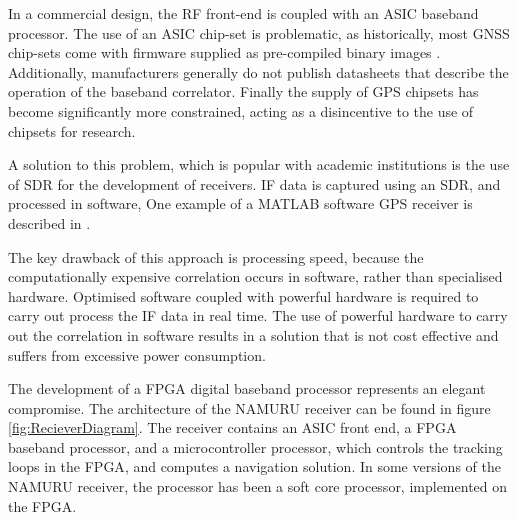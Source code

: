 In a commercial design, the RF front-end is coupled with an \ac{ASIC} baseband processor. The use of an \ac{ASIC} chip-set is problematic, as historically, most \ac{GNSS} chip-sets come with firmware supplied as pre-compiled binary images \cite{Glennon11aquariusfirmware}. 
Additionally, manufacturers generally do not publish datasheets that describe the operation of the baseband correlator\cite{Glennon11aquariusfirmware}. Finally the supply of GPS chipsets has become significantly more constrained, acting as a disincentive to the use of chipsets for research.

A solution to this problem, which is popular with academic institutions is the use of \ac{SDR} for the development of receivers. \ac{IF} data is captured using an \ac{SDR}, and processed in software\cite{Glennon11aquariusfirmware}, One example of a MATLAB software \ac{GPS} receiver is described in \cite{KaiBorre}.

The key drawback of this approach is processing speed, because the computationally expensive correlation occurs in software, rather than specialised hardware. Optimised software coupled with powerful hardware is required to carry out process the \ac{IF} data in real time. The use of powerful hardware to carry out the correlation in software results in a solution that is not cost effective and suffers from excessive power consumption.

The development of a \ac{FPGA} digital baseband processor represents an elegant compromise. 
The architecture of the \ac{NAMURU} receiver can be found in figure \ref{fig:RecieverDiagram}. The receiver contains an \ac{ASIC} front end, a \ac{FPGA} baseband processor, and a microcontroller processor, which controls the tracking loops in the \ac{FPGA}, and computes a navigation solution. In some versions of the \ac{NAMURU} receiver, the processor has been a soft core processor, implemented on the \ac{FPGA}.

